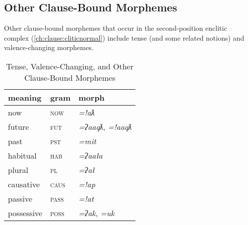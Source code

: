 \subsection{Other Clause-Bound Morphemes} \label{sec:otherclause}

Other clause-bound morphemes that occur in the second-position enclitic complex (\ref{ch:clause:cliticnormal}) include tense (and some related notions) and valence-changing morphemes.

\begin{table}[ht]
\centering
\caption{Tense, Valence-Changing, and Other Clause-Bound Morphemes}
\label{table:tense}
\begin{tabular}{lll}
meaning                        & gram               & morph                        \\ \hline
\multicolumn{1}{|l|}{now}      & \multicolumn{1}{l|}{\textsc{now}}   & \multicolumn{1}{l|}{\textit{=!aƛ}}     \\ \hline
\multicolumn{1}{|l|}{future}   & \multicolumn{1}{l|}{\textsc{fut}}   & \multicolumn{1}{l|}{\textit{=ʔaaqƛ}, \textit{=!aaqƛ}}   \\ \hline
\multicolumn{1}{|l|}{past}     & \multicolumn{1}{l|}{\textsc{pst}}   & \multicolumn{1}{l|}{\textit{=mit}}     \\ \hline
\multicolumn{1}{|l|}{habitual} & \multicolumn{1}{l|}{\textsc{hab}} & \multicolumn{1}{l|}{\textit{=ʔaała}}    \\ \hline
\multicolumn{1}{|l|}{plural\footnotemark} & \multicolumn{1}{l|}{\textsc{pl}} & \multicolumn{1}{l|}{\textit{=ʔał}}    \\ \hline
\multicolumn{1}{|l|}{causative}  & \multicolumn{1}{l|}{\textsc{caus}} & \multicolumn{1}{l|}{\textit{=!ap}}      \\ \hline
\multicolumn{1}{|l|}{passive\footnotemark}    & \multicolumn{1}{l|}{\textsc{pass}} & \multicolumn{1}{l|}{\textit{=!at}}      \\ \hline
\multicolumn{1}{|l|}{possessive} & \multicolumn{1}{l|}{\textsc{poss}} & \multicolumn{1}{l|}{\textit{=ʔak}, \textit{=uk}} \\ \hline
\end{tabular}
\end{table}

\addtocounter{footnote}{-1}
\addtocounter{footnote}{1}

